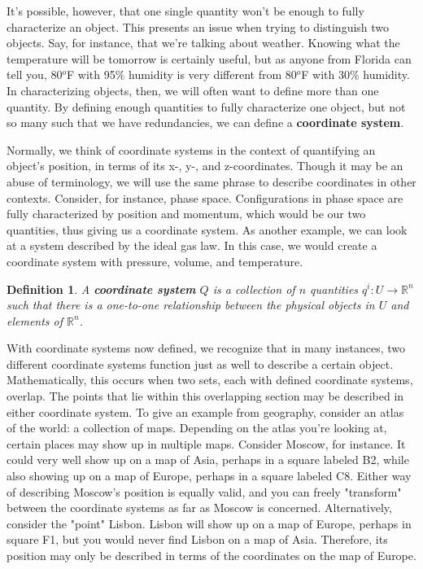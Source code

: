 \documentclass{book}
\newtheorem{defn}[equation]{Definition}
\begin{document}
It's possible, however, that one single quantity won't be enough to fully characterize an object. This presents an issue when trying to distinguish two objects. Say, for instance, that we're talking about weather. Knowing what the temperature will be tomorrow is certainly useful, but as anyone from Florida can tell you, 80$^o$F with 95$\%$ humidity is very different from 80$^o$F with 30$\%$ humidity. In characterizing objects, then, we will often want to define more than one quantity. By defining enough quantities to fully characterize one object, but not so many such that we have redundancies, we can define a \textbf{coordinate system}.



Normally, we think of coordinate systems in the context of quantifying an object's position, in terms of its x-, y-, and z-coordinates. Though it may be an abuse of terminology, we will use the same phrase to describe coordinates in other contexts. Consider, for instance, phase space. Configurations in phase space are fully characterized by position and momentum, which would be our two quantities, thus giving us a coordinate system. As another example, we can look at a system described by the ideal gas law. In this case, we would create a coordinate system with pressure, volume, and temperature. 

\begin{defn}
	A \textbf{coordinate system} $Q$ is a collection of $n$ quantities $q^i : U \to \mathbb{R}^n$ such that there is a one-to-one relationship between the physical objects in $U$ and elements of $\mathbb{R}^n$.
\end{defn}



With coordinate systems now defined, we recognize that in many instances, two different coordinate systems function just as well to describe a certain object. Mathematically, this occurs when two sets, each with defined coordinate systems, overlap. The points that lie within this overlapping section may be described in either coordinate system. To give an example from geography, consider an atlas of the world: a collection of maps. Depending on the atlas you're looking at, certain places may show up in multiple maps. Consider Moscow, for instance. It could very well show up on a map of Asia, perhaps in a square labeled B2, while also showing up on a map of Europe, perhaps in a square labeled C8. Either way of describing Moscow's position is equally valid, and you can freely "transform" between the coordinate systems as far as Moscow is concerned. Alternatively, consider the "point" Lisbon. Lisbon will show up on a map of Europe, perhaps in square F1, but you would never find Lisbon on a map of Asia. Therefore, its position may only be described in terms of the coordinates on the map of Europe.
\end{document}
